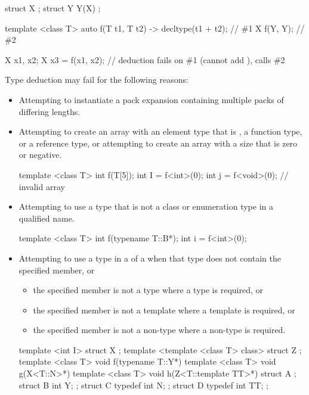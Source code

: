 \pnum
\begin{example}
\begin{codeblock}
struct X { };
struct Y {
  Y(X){}
};

template <class T> auto f(T t1, T t2) -> decltype(t1 + t2);     // \#1
X f(Y, Y);                                                      // \#2

X x1, x2;
X x3 = f(x1, x2);   // deduction fails on \#1 (cannot add ), calls \#2
\end{codeblock}
\end{example}

\pnum
\begin{note}
Type deduction may fail for the following reasons:
\begin{itemize}
\item Attempting to instantiate a pack expansion containing multiple packs of differing lengths.
\item
Attempting to create an array with an element type that is , a
function type, or a reference type, or attempting
to create an array with a size that is zero or negative.
\begin{example}
\begin{codeblock}
template <class T> int f(T[5]);
int I = f<int>(0);
int j = f<void>(0);             // invalid array
\end{codeblock}
\end{example}
\item
Attempting to use a type that is not a class or enumeration type in a qualified name.
\begin{example}
\begin{codeblock}
template <class T> int f(typename T::B*);
int i = f<int>(0);
\end{codeblock}
\end{example}
\item
Attempting to use a type in a  of a
 when
that type does not contain the specified member, or
\begin{itemize}
\item
the specified member is not a type where a type is required, or
\item
the specified member is not a template where a template is required, or
\item
the specified member is not a non-type where a non-type is required.
\end{itemize}
\begin{example}
\begin{codeblock}
template <int I> struct X { };
template <template <class T> class> struct Z { };
template <class T> void f(typename T::Y*){}
template <class T> void g(X<T::N>*){}
template <class T> void h(Z<T::template TT>*){}
struct A {};
struct B { int Y; };
struct C {
  typedef int N;
};
struct D {
  typedef int TT;
};


\end{codeblock}
\end{example}
\end{itemize}
\end{note}
